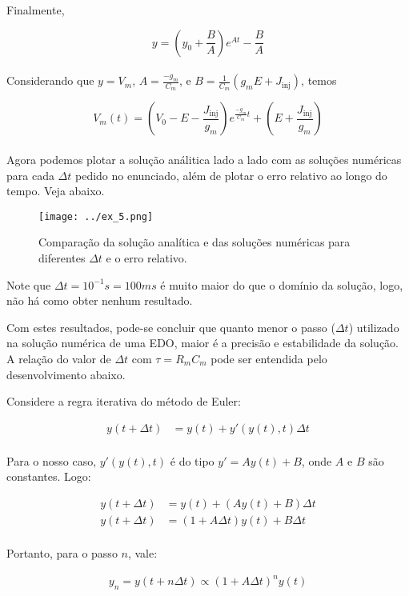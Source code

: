 \documentclass[portuguese,12pt,a4paper]{article}
\begin{document}
	Finalmente,
	
	$$ y = \left(y_0 + \frac{B}{A}\right)e^{At} - \frac{B}{A}$$\\

	Considerando que $y = V_m$, $A = \frac{-g_m}{C_m}$, e $B = \frac{1}{C_m}(g_mE + J_{\text{inj}})$, temos
	
	$$V_m(t) = \left(V_0 - E - \frac{J_{\text{inj}}}{g_m}\right)e^{\frac{-g_m}{C_m}t} + \left(E + \frac{J_{\text{inj}}}{g_m}\right)$$
	\\
	
	Agora podemos plotar a solução análitica lado a lado com as soluções numéricas para cada $\Delta t$ pedido no enunciado, além de plotar o erro relativo ao longo do tempo. Veja abaixo.
	
	
	\begin{figure}[H]
		\centering
		\hspace*{-3.5cm}
		\texttt{[image: ../ex\_5.png]}
		\caption{Comparação da solução analítica e das soluções numéricas para diferentes $\Delta t$ e o erro relativo.}
	\end{figure}
	
	Note que $\Delta t = 10^{-1} s = 100 ms$ é muito maior do que o domínio da solução, logo, não há como obter nenhum resultado.
	
	Com estes resultados, pode-se concluir que quanto menor o passo ($\Delta t$) utilizado na solução numérica de uma EDO, maior é a precisão e estabilidade da solução. A relação do valor de $\Delta t$ com $\tau = R_mC_m$ pode ser entendida pelo desenvolvimento abaixo. 	
	
	
	Considere a regra iterativa do método de Euler:
	
	\begin{align*}
		y(t + \Delta t) &= y(t) + y'(y(t), t)\Delta t \\
	\end{align*}
	
	Para o nosso caso, $y'(y(t), t)$ é do tipo $y' = Ay(t) + B$, onde $A$ e $B$ são constantes. Logo:
	
	\begin{align*}
		y(t + \Delta t) &= y(t) + (Ay(t) + B)\Delta t \\
		y(t + \Delta t) &= (1 + A\Delta t)y(t) + B\Delta t \\
	\end{align*}
	
	Portanto, para o passo $n$, vale:
	
	\begin{align*}
		y_n = y(t + n\Delta t) \propto (1 + A\Delta t)^n y(t)
	\end{align*}
	
\end{document}
